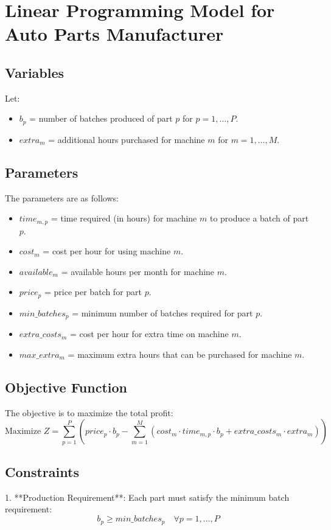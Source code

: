 \documentclass{article}
\begin{document}
\section*{Linear Programming Model for Auto Parts Manufacturer}

\subsection*{Variables}
Let:
\begin{itemize}
    \item $b_p$ = number of batches produced of part $p$ for $p = 1, \ldots, P$.
    \item $extra_m$ = additional hours purchased for machine $m$ for $m = 1, \ldots, M$.
\end{itemize}

\subsection*{Parameters}
The parameters are as follows:
\begin{itemize}
    \item $time_{m,p}$ = time required (in hours) for machine $m$ to produce a batch of part $p$.
    \item $cost_m$ = cost per hour for using machine $m$.
    \item $available_m$ = available hours per month for machine $m$.
    \item $price_p$ = price per batch for part $p$.
    \item $min\_batches_p$ = minimum number of batches required for part $p$.
    \item $extra\_costs_m$ = cost per hour for extra time on machine $m$.
    \item $max\_extra_m$ = maximum extra hours that can be purchased for machine $m$.
\end{itemize}

\subsection*{Objective Function}
The objective is to maximize the total profit:
\[
\text{Maximize } Z = \sum_{p=1}^P \left( price_p \cdot b_p - \sum_{m=1}^M (cost_m \cdot time_{m,p} \cdot b_p + extra\_costs_m \cdot extra_m) \right)
\]

\subsection*{Constraints}
1. **Production Requirement**: Each part must satisfy the minimum batch requirement:
\[
b_p \geq min\_batches_p \quad \forall p = 1, \ldots, P
\]
\end{document}
